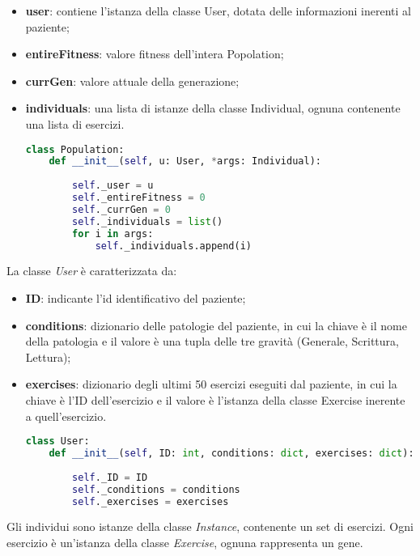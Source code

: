 \documentclass{article}
\begin{document}
\begin{itemize}

\item\textbf{user}: contiene l'istanza della classe User, dotata delle informazioni inerenti al paziente;

\item\textbf{entireFitness}: valore fitness dell'intera Popolation;

\item\textbf{currGen}: valore attuale della generazione;

\item\textbf{individuals}: una lista di istanze della classe Individual, ognuna contenente una lista di esercizi.



\begin{lstlisting}[language = Python]
    class Population:
    def __init__(self, u: User, *args: Individual):
        
        self._user = u
        self._entireFitness = 0
        self._currGen = 0
        self._individuals = list()
        for i in args:
            self._individuals.append(i)
\end{lstlisting}
\end{itemize}

\bigskip

La classe \textit{User} è caratterizzata da:
\begin{itemize}
\item\textbf{ID}: indicante l'id identificativo del paziente;
\item\textbf{conditions}: dizionario delle patologie del paziente, in cui la chiave è il nome della patologia e il valore è una tupla delle tre gravità (Generale, Scrittura, Lettura);
\item\textbf{exercises}: dizionario degli ultimi 50 esercizi eseguiti dal paziente, in cui la chiave è l'ID dell'esercizio e il valore è l'istanza della classe Exercise inerente a quell'esercizio.
\begin{lstlisting}[language = Python]
    class User:
    def __init__(self, ID: int, conditions: dict, exercises: dict):
        
        self._ID = ID
        self._conditions = conditions
        self._exercises = exercises
\end{lstlisting}
\end{itemize}
\pagebreak


Gli individui sono istanze della classe \textit{Instance}, contenente un set di esercizi. Ogni esercizio è un'istanza della classe \textit{Exercise}, ognuna rappresenta un gene.
\end{document}
